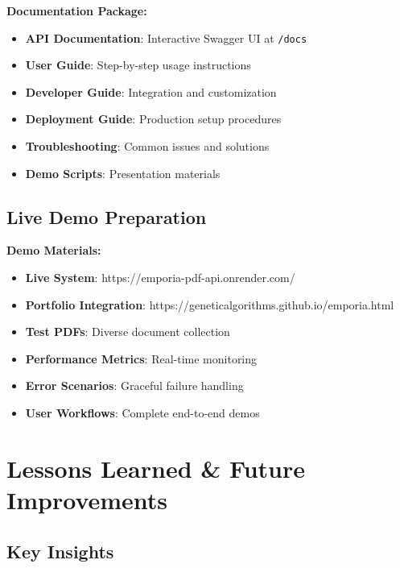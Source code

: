 \documentclass[11pt]{article}
\begin{document}
\begin{notebox}
\textbf{Documentation Package:}
\begin{itemize}
    \item \textbf{API Documentation}: Interactive Swagger UI at \texttt{/docs}
    \item \textbf{User Guide}: Step-by-step usage instructions
    \item \textbf{Developer Guide}: Integration and customization
    \item \textbf{Deployment Guide}: Production setup procedures
    \item \textbf{Troubleshooting}: Common issues and solutions
    \item \textbf{Demo Scripts}: Presentation materials
\end{itemize}
\end{notebox}

\subsection*{Live Demo Preparation}

\begin{techbox}
\textbf{Demo Materials:}
\begin{itemize}
    \item \textbf{Live System}: https://emporia-pdf-api.onrender.com/
    \item \textbf{Portfolio Integration}: https://geneticalgorithms.github.io/emporia.html
    \item \textbf{Test PDFs}: Diverse document collection
    \item \textbf{Performance Metrics}: Real-time monitoring
    \item \textbf{Error Scenarios}: Graceful failure handling
    \item \textbf{User Workflows}: Complete end-to-end demos
\end{itemize}
\end{techbox}

\section*{Lessons Learned \& Future Improvements}

\subsection*{Key Insights}
\end{document}
